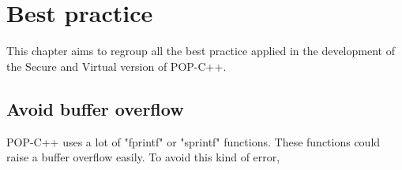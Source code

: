 \section{Best practice}
\label{best_practice}
This chapter aims to regroup all the best practice applied in the development of the Secure and Virtual version of POP-C++. 

\subsection{Avoid buffer overflow}
POP-C++ uses a lot of "fprintf" or "sprintf" functions. These functions could raise a buffer overflow easily. To avoid this kind of error, 